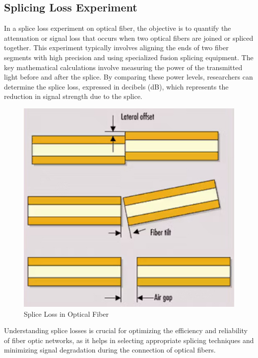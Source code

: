 \subsection{\label{sec:intro_level3}Splicing Loss Experiment}
In a splice loss experiment on optical fiber, the objective is to quantify the attenuation or signal loss that occurs when two optical fibers are joined or spliced together. This experiment typically involves aligning the ends of two fiber segments with high precision and using specialized fusion splicing equipment. The key mathematical calculations involve measuring the power of the transmitted light before and after the splice. By comparing these power levels, researchers can determine the splice loss, expressed in decibels (dB), which represents the reduction in signal strength due to the splice. 
\begin{figure}
    \centering
    \includegraphics[scale=0.7]{chapters/splice.jpg}
    \caption{Splice Loss in Optical Fiber}
\end{figure}
Understanding splice losses is crucial for optimizing the efficiency and reliability of fiber optic networks, as it helps in selecting appropriate splicing techniques and minimizing signal degradation during the connection of optical fibers.
